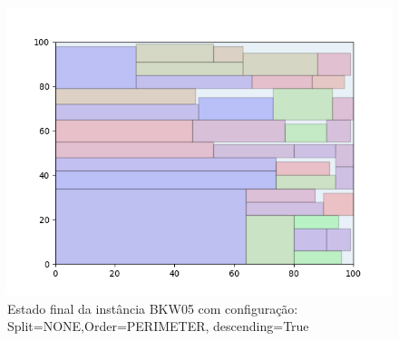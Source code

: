 \begin{figure}[H]
    \centering
    \caption[]{Estado final da instância BKW05 com configuração: Split=NONE,Order=PERIMETER, descending=True}
    \label{fig:bkw05-none-perimeter-true}
    \includegraphics[scale=0.5]{output/figures/bkw/bkw05/none/perimeter/true/00}
\end{figure}